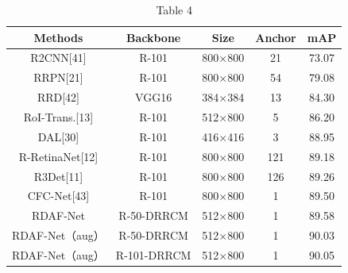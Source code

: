 \documentclass[journal]{IEEEtran}
\begin{document}
\begin{table}[t]
\centering
\begin{tabular}{c c c c c}
\toprule
\textbf{Methods} & \textbf{Backbone} & \textbf{Size} & \textbf{Anchor} & \textbf{mAP} \\
\midrule
R2CNN[41] & R-101 & 800×800 & 21 & 73.07 \\
RRPN[21] & R-101 & 800×800 & 54 & 79.08 \\
RRD[42] & VGG16 & 384×384 & 13 & 84.30 \\
RoI-Trans.[13] & R-101 & 512×800 & 5 & 86.20 \\
DAL[30] & R-101 & 416×416 & 3 & 88.95 \\
R-RetinaNet[12] & R-101 & 800×800 & 121 & 89.18 \\
R3Det[11] & R-101 & 800×800 & 126 & 89.26 \\
CFC-Net[43] & R-101 & 800×800 & 1 & 89.50 \\
RDAF-Net & R-50-DRRCM & 512×800 & 1 & 89.58 \\
RDAF-Net（aug） & R-50-DRRCM & 512×800 & 1 & 90.03 \\
RDAF-Net（aug） & R-101-DRRCM & 512×800 & 1 & 90.05 \\
\bottomrule
\end{tabular}
\caption{Table 4}
\label{tab:tbl_4}
\end{table}
\end{document}
